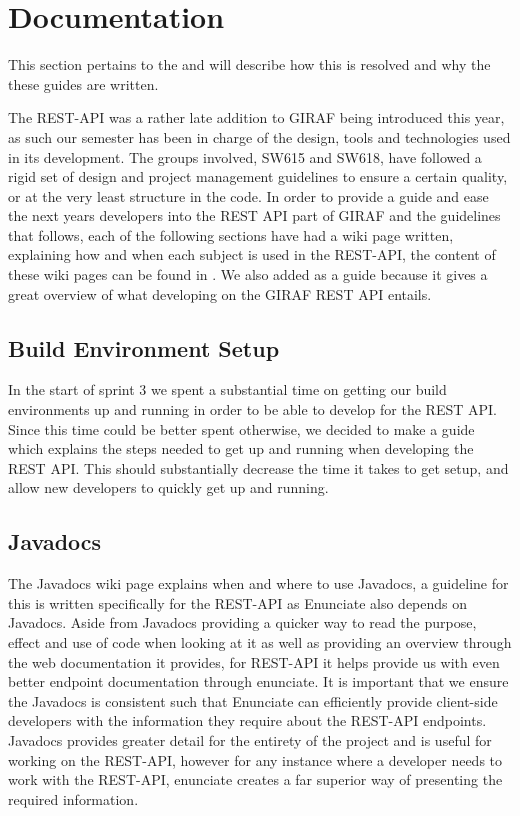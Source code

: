 \section{Documentation}
This section pertains to the  and will describe how this is resolved and why the these guides are written.

The REST-API was a rather late addition to GIRAF being introduced this year, as such our semester has been in charge of the design, tools and technologies used in its development.
The groups involved, SW615 and SW618, have followed a rigid set of design and project management guidelines to ensure a certain quality, or at the very least structure in the code.
In order to provide a guide and ease the next years developers into the REST API part of GIRAF and the guidelines that follows, each of the following sections have had a wiki page written, explaining how and when each subject is used in the REST-API, the content of these wiki pages can be found in .
We also added  as a guide because it gives a great overview of what developing on the GIRAF REST API entails.

\subsection{Build Environment Setup}
In the start of sprint 3 we spent a substantial time on getting our build environments up and running in order to be able to develop for the REST API.
Since this time could be better spent otherwise, we decided to make a guide which explains the steps needed to get up and running when developing the REST API.
This should substantially decrease the time it takes to get setup, and allow new developers to quickly get up and running.

\subsection{Javadocs}
The Javadocs wiki page explains when and where to use Javadocs, a guideline for this is written specifically for the REST-API as Enunciate also depends on Javadocs.
Aside from Javadocs providing a quicker way to read the purpose, effect and use of code when looking at it as well as providing an overview through the web documentation it provides, for REST-API it helps provide us with even better endpoint documentation through enunciate.
It is important that we ensure the Javadocs is consistent such that Enunciate can efficiently provide client-side developers with the information they require about the REST-API endpoints.
Javadocs provides greater detail for the entirety of the project and is useful for working on the REST-API, however for any instance where a developer needs to work with the REST-API, enunciate creates a far superior way of presenting the required information.

